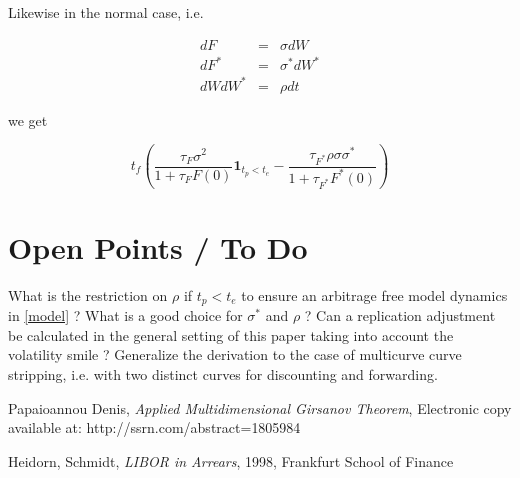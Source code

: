 \documentclass{amsart}
\theoremstyle{plain}
\numberwithin{equation}{section}
\begin{document}
Likewise in the normal case, i.e.

\begin{eqnarray}\label{model_n}
dF &=& \sigma dW \\
dF^* &=& \sigma^* dW^* \\
dW dW^* &=& \rho dt
\end{eqnarray}

we get

\begin{equation}
t_f\left(\frac{\tau_F \sigma^2}{1+\tau_F F(0)} \textbf{1}_{t_p<t_e} - \frac{\tau_{F^*} \rho\sigma\sigma^*}{1+\tau_{F^*} F^*(0)}\right)
\end{equation}


\section{Open Points / To Do}

What is the restriction on $\rho$ if $t_p < t_e$  to ensure an arbitrage free model dynamics in \ref{model} ? What is a good choice for $\sigma^*$ and $\rho$  ? Can a replication adjustment be calculated in the general setting of this paper taking into account the volatility smile ? Generalize the derivation to the case of multicurve curve stripping, i.e. with two distinct curves for discounting and forwarding.




\begin{thebibliography}{2}

Papaioannou Denis, \textit{Applied Multidimensional Girsanov Theorem},
Electronic copy available at: http://ssrn.com/abstract=1805984

Heidorn, Schmidt, \textit{LIBOR in Arrears}, 1998, Frankfurt School of Finance

\end{thebibliography}
\end{document}
